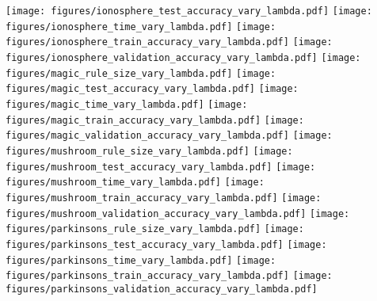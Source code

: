 \begin{figure*}[t]
\texttt{[image: figures/ionosphere\_test\_accuracy\_vary\_lambda.pdf]}
\texttt{[image: figures/ionosphere\_time\_vary\_lambda.pdf]}
\texttt{[image: figures/ionosphere\_train\_accuracy\_vary\_lambda.pdf]}
\texttt{[image: figures/ionosphere\_validation\_accuracy\_vary\_lambda.pdf]}
\texttt{[image: figures/magic\_rule\_size\_vary\_lambda.pdf]}
\texttt{[image: figures/magic\_test\_accuracy\_vary\_lambda.pdf]}
\texttt{[image: figures/magic\_time\_vary\_lambda.pdf]}
\texttt{[image: figures/magic\_train\_accuracy\_vary\_lambda.pdf]}
\texttt{[image: figures/magic\_validation\_accuracy\_vary\_lambda.pdf]}
\texttt{[image: figures/mushroom\_rule\_size\_vary\_lambda.pdf]}
\texttt{[image: figures/mushroom\_test\_accuracy\_vary\_lambda.pdf]}
\texttt{[image: figures/mushroom\_time\_vary\_lambda.pdf]}
\texttt{[image: figures/mushroom\_train\_accuracy\_vary\_lambda.pdf]}
\texttt{[image: figures/mushroom\_validation\_accuracy\_vary\_lambda.pdf]}
\texttt{[image: figures/parkinsons\_rule\_size\_vary\_lambda.pdf]}
\texttt{[image: figures/parkinsons\_test\_accuracy\_vary\_lambda.pdf]}
\texttt{[image: figures/parkinsons\_time\_vary\_lambda.pdf]}
\texttt{[image: figures/parkinsons\_train\_accuracy\_vary\_lambda.pdf]}
\texttt{[image: figures/parkinsons\_validation\_accuracy\_vary\_lambda.pdf]}

\end{figure*}
